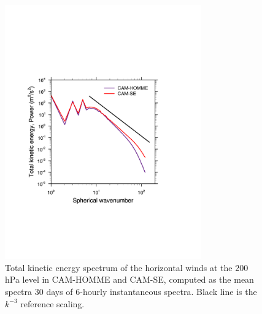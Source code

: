\begin{figure}[h]
\centering
\includegraphics[width=20pc]{figs/kespectra.pdf}
\caption{Total kinetic energy spectrum of the horizontal winds at the 200 hPa level in CAM-HOMME and CAM-SE, computed as the mean spectra 30 days of 6-hourly instantaneous spectra. Black line is the $k^{-3}$ reference scaling.}
\label{fig:kespectra}
\end{figure}

